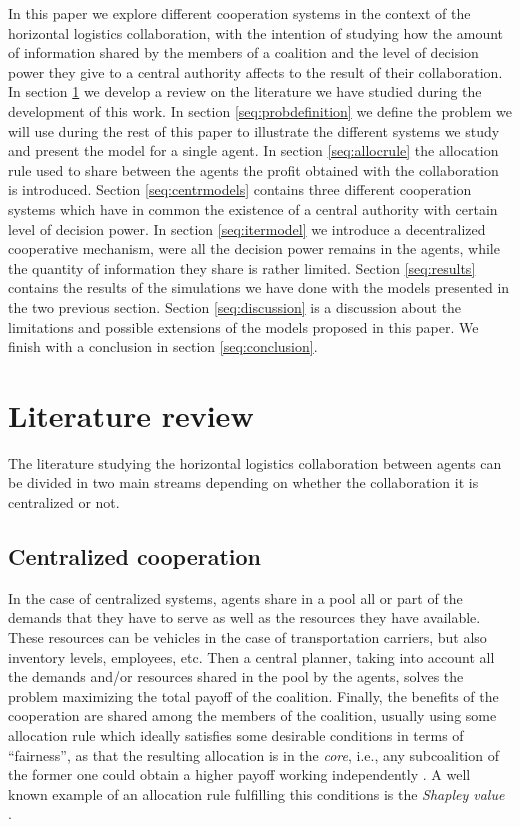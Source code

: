 \documentclass{article}
\begin{document}
In this paper we explore different cooperation systems in the context of the horizontal logistics collaboration, with the intention of studying how the amount of information shared by the members of a coalition and the level of decision power they give to a central authority affects to the result of their collaboration. In section \ref{seq:litreview} we develop a review on the literature we have studied during the development of this work. In section \ref{seq:probdefinition} we define the problem we will use during the rest of this paper to illustrate the different systems we study and present the model for a single agent. In section \ref{seq:allocrule} the allocation rule used to share between the agents the profit obtained with the collaboration is introduced. Section \ref{seq:centrmodels} contains three different cooperation systems which have in common the existence of a central authority with certain level of decision power. In section \ref{seq:itermodel} we introduce a decentralized cooperative mechanism, were all the decision power remains in the agents, while the quantity of information they share is rather limited. Section \ref{seq:results} contains the results of the simulations we have done with the models presented in the two previous section. Section \ref{seq:discussion} is a discussion about the limitations and possible extensions of the models proposed in this paper. We finish with a conclusion in section \ref{seq:conclusion}.



\section{Literature review}\label{seq:litreview}

The literature studying the horizontal logistics collaboration between agents
can be divided in two main streams depending on whether the collaboration it is
centralized or not.

\subsection{Centralized cooperation}

In the case of centralized systems, agents share in a pool all or
part of the demands that they have to serve as well as the resources they have available. These resources can be vehicles in the case of transportation carriers, but also inventory levels, employees, etc. Then a central planner, taking into account all the demands and/or resources shared in the pool by the agents, solves the problem maximizing the total payoff of the coalition. Finally, the benefits of the cooperation are shared among the members of the coalition, usually using some allocation rule which ideally satisfies some desirable conditions in terms of ``fairness'', as that the resulting allocation is in the \emph{core}, i.e., any subcoalition of the former one could obtain a higher payoff working
independently \parencite{GONZALEZ2010}. A well known example of an allocation rule fulfilling this conditions is the \emph{Shapley value} \parencite{SHAPLEY1952}.
\end{document}

